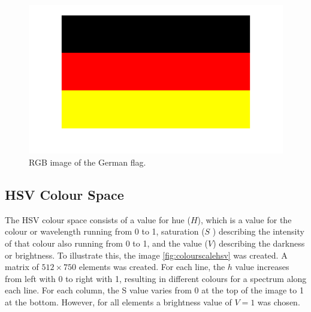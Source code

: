 \begin{figure}[H]
	\centering
		\includegraphics[width=\textwidth]{images/germanflag.png}
		\caption{RGB image of the German flag.}
		\label{fig:germanflag}
\end{figure}

\subsection{HSV Colour Space}
The HSV colour space consists of a value for hue ($H$), which is a value for the colour or wavelength running from 0 to 1, saturation ($S$ ) describing the intensity of that colour also running from 0 to 1, and the value ($V$) describing the darkness or brightness. To illustrate this, the image \ref{fig:colourscalehsv} was created. A matrix of $512\times750$ elements was created. For each line, the $h$ value increases from left with 0 to right with 1, resulting in different colours for a spectrum along each line. For each column, the S value varies from 0 at the top of the image to 1 at the bottom. However, for all elements a brightness value of $V=1$ was chosen.

